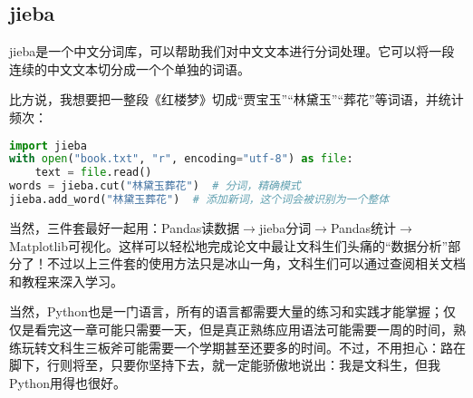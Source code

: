 \documentclass[../main.tex]{subfiles}
\begin{document}
\subsection{jieba}
jieba是一个中文分词库，可以帮助我们对中文文本进行分词处理。它可以将一段连续的中文文本切分成一个个单独的词语。

比方说，我想要把一整段《红楼梦》切成“贾宝玉”“林黛玉”“葬花”等词语，并统计频次：
\begin{lstlisting}[language=python]
import jieba
with open("book.txt", "r", encoding="utf-8") as file:
    text = file.read()
words = jieba.cut("林黛玉葬花")  # 分词，精确模式
jieba.add_word("林黛玉葬花")  # 添加新词，这个词会被识别为一个整体
\end{lstlisting}

当然，三件套最好一起用：Pandas读数据$\rightarrow$jieba分词$ \rightarrow $Pandas统计$ \rightarrow $Matplotlib可视化。这样可以轻松地完成论文中最让文科生们头痛的“数据分析”部分了！不过以上三件套的使用方法只是冰山一角，文科生们可以通过查阅相关文档和教程来深入学习。

当然，Python也是一门语言，所有的语言都需要大量的练习和实践才能掌握；仅仅是看完这一章可能只需要一天，但是真正熟练应用语法可能需要一周的时间，熟练玩转文科生三板斧可能需要一个学期甚至还要多的时间。不过，不用担心：路在脚下，行则将至，只要你坚持下去，就一定能骄傲地说出：我是文科生，但我Python用得也很好。
\end{document}
